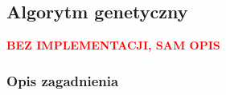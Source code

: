 \subsection{Algorytm genetyczny}
\label{subsec:genetyczny}
\begin{center}
    \textcolor{red}{\textbf{BEZ IMPLEMENTACJI, SAM OPIS}}
\end{center}

\subsubsection{Opis zagadnienia}
